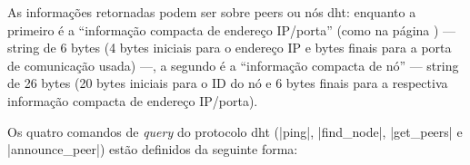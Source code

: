 As informações retornadas podem ser sobre \glspl*{peer} ou nós \gls*{dht}: enquanto a
primeiro é a \enquote{informação compacta de endereço IP/porta} (como na página
\pageref{par:compact}) --- string de 6 bytes (4 bytes iniciais para o endereço IP e
bytes finais para a porta de comunicação usada) ---, a segundo é a
\enquote{informação compacta de nó} --- string de 26 bytes (20 bytes iniciais para o ID
do nó e 6 bytes finais para a respectiva informação compacta de endereço IP/porta).

Os quatro comandos de \emph{query} do protocolo \gls*{dht} (\sverb|ping|,
\sverb|find_node|, \sverb|get_peers| e \sverb|announce_peer|) estão definidos da
seguinte forma:








